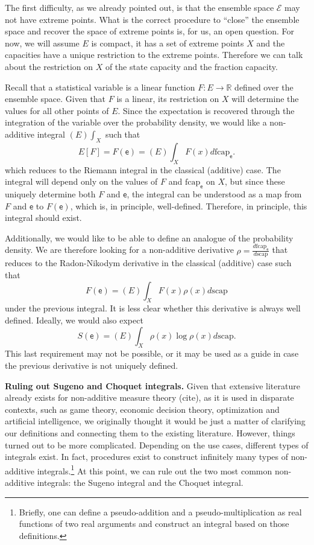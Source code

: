 \documentclass[10pt,twocolumn, nofootinbib]{revtex4-2}
\newcommand\capacity{\mathrm{scap}}
\newcommand\frcap{\mathrm{fcap}}
\newcommand{\ens}[1][e] {\mathsf{#1}} %
\newcommand{\Ens}[1][E] {\mathcal{#1}} %
\begin{document}
The first difficulty, as we already pointed out, is that the ensemble space $\Ens$ may not have extreme points. What is the correct procedure to ``close'' the ensemble space and recover the space of extreme points is, for us, an open question. For now, we will assume $E$ is compact, it has a set of extreme points $X$ and the capacities have a unique restriction to the extreme points. Therefore we can talk about the restriction on $X$ of the state capacity and the fraction capacity.

Recall that a statistical variable is a linear function $F : E \to \mathbb{R}$ defined over the ensemble space. Given that $F$ is a linear, its restriction on $X$ will determine the values for all other points of $E$. Since the expectation is recovered through the integration of the variable over the probability density, we would like a non-additive integral $(E)\int_X$ such that
\begin{equation}
	E[F] = F(\ens) = (E)\int_X F(x) d\frcap_{\ens}.
\end{equation}
which reduces to the Riemann integral in the classical (additive) case. The integral will depend only on the values of $F$ and $\frcap_{\ens}$ on $X$, but since these uniquely determine both $F$ and $\ens$, the integral can be understood as a map from $F$ and $\ens$ to $F(\ens)$, which is, in principle, well-defined. Therefore, in principle, this integral should exist.

Additionally, we would like to be able to define an analogue of the probability density. We are therefore looking for a non-additive derivative $\rho = \frac{d \frcap_{\ens}}{d \capacity}$ that reduces to the Radon-Nikodym derivative in the classical (additive) case such that
\begin{equation}
	F(\ens) = (E)\int_X F(x) \rho(x) d\capacity
\end{equation}
under the previous integral. It is less clear whether this derivative is always well defined. Ideally, we would also expect
\begin{equation}
	S(\ens) = (E)\int_X \rho(x) \log \rho(x) d\capacity.
\end{equation}
This last requirement may not be possible, or it may be used as a guide in case the previous derivative is not uniquely defined.

\textbf{Ruling out Sugeno and Choquet integrals.} Given that extensive literature already exists for non-additive measure theory (cite), as it is used in disparate contexts, such as game theory, economic decision theory, optimization and artificial intelligence, we originally thought it would be just a matter of clarifying our definitions and connecting them to the existing literature. However, things turned out to be more complicated. Depending on the use cases, different types of integrals exist. In fact, procedures exist\cite{nonadditive2014,pap2013} to construct infinitely many types of non-additive integrals.\footnote{Briefly, one can define a pseudo-addition and a pseudo-multiplication as real functions of two real arguments and construct an integral based on those definitions.} At this point, we can rule out the two most common non-additive integrals: the Sugeno integral and the Choquet integral.
\end{document}
